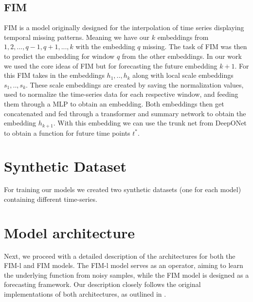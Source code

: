 \documentclass{article}
\theoremstyle{plain}
\theoremstyle{definition}
\theoremstyle{remark}
\begin{document}
\subsection{FIM}\label{sec:FIM-l}
FIM\cite{fim-l} is a model originally designed for the interpolation of time series displaying temporal missing patterns. Meaning we have our $k$ embeddings from $1, 2, ..., q-1, q+1, ..., k$ with the embedding $q$ missing. The task of FIM was then to predict the embedding for window $q$ from the other embeddings. In our work we used the core ideas of FIM but for forecasting the future embedding $k+1$. For this FIM takes in the embeddings $h_1, .., h_k$ along with local scale embeddings $s_1, .., s_k$. These scale embeddings are created by saving the normalization values, used to normalize the time-series data for each respective window, and feeding them through a MLP to obtain an embedding. Both embeddings then get concatenated and fed through a transformer and summary network to obtain the embedding $h_{k+1}$. With this embedding we can use the trunk net from DeepONet to obtain a function for future time points $t^*$.

\section{Synthetic Dataset}
For training our models we created two synthetic datasets (one for each model) containing different time-series.



\section{Model architecture}
Next, we proceed with a detailed description of the architectures for both the FIM-l and FIM models. The FIM-l model serves as an operator, aiming to learn the underlying function from noisy samples, while the FIM model is designed as a forecasting framework. Our description closely follows the original implementations of both architectures, as outlined in \cite{fim-l}.
\end{document}
